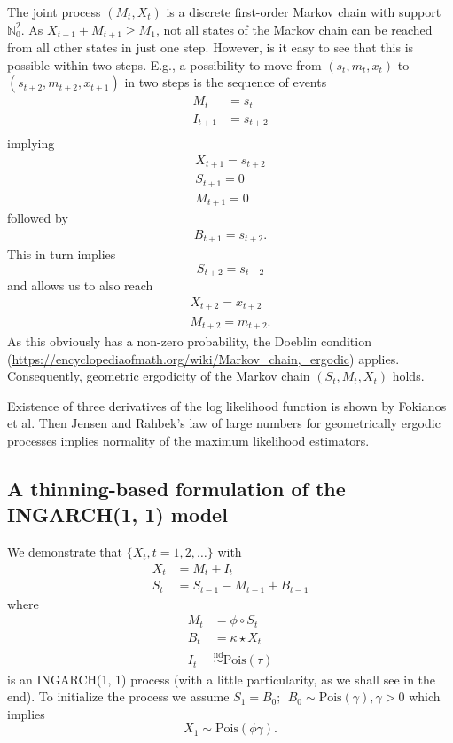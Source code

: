\documentclass[10pt,a4paper]{article}
\begin{document}
The joint process $(M_t, X_t)$ is a discrete first-order Markov chain with support $\mathbb{N}_0^2$. As $X_{t + 1} + M_{t + 1} \geq M_{1}$, not all states of the Markov chain can be reached from all other states in just one step. However, is it easy to see that this is possible within two steps. E.g., a possibility to move from $(s_t, m_t, x_t)$ to $(s_{t + 2}, m_{t + 2}, x_{t + 1})$ in two steps is the sequence of events
\begin{align*}
M_t & = s_t\\
I_{t + 1} & = s_{t + 2}\\
\end{align*}
implying
\begin{align*}
X_{t + 1} = s_{t + 2}\\
S_{t + 1} = 0\\
M_{t + 1} = 0
\end{align*}
followed by
\begin{align*}
B_{t + 1} = s_{t + 2}.
\end{align*}
This in turn implies
$$
S_{t + 2} = s_{t + 2}
$$
and allows us to also reach
\begin{align*}
X_{t + 2} = x_{t + 2}\\
M_{t + 2} = m_{t + 2}.
\end{align*}
As this obviously has a non-zero probability, the Doeblin condition (\url{https://encyclopediaofmath.org/wiki/Markov_chain,_ergodic}) applies. Consequently, geometric ergodicity of the Markov chain $(S_t, M_t, X_t)$ holds.

Existence of three derivatives of the log likelihood function is shown by Fokianos et al. Then Jensen and Rahbek's law of large numbers for geometrically ergodic processes implies normality of the maximum likelihood estimators.


\subsection{A thinning-based formulation of the INGARCH(1, 1) model}
\label{appendix:ingarch}

We demonstrate that $\{X_t, t = 1, 2, \dots\}$ with
\begin{align}
X_t & = M_t + I_t\label{eq:X_ingarch}\\
S_t & = S_{t - 1} - M_{t - 1} + B_{t - 1} \label{eq:S_ingarch}
\end{align}
where
\begin{align}
M_t & = \phi \circ S_t\\
B_t & = \kappa \star X_t\\
I_t & \stackrel{\text{iid}}{\sim} \text{Pois}(\tau)
\end{align}
is an INGARCH(1, 1) process (with a little particularity, as we shall see in the end). To initialize the process we assume $S_1 = B_{0}; \ \ B_{0} \sim \text{Pois}(\gamma), \gamma > 0$ which implies
$$
X_1 \sim \text{Pois}(\phi\gamma).
$$
\end{document}
